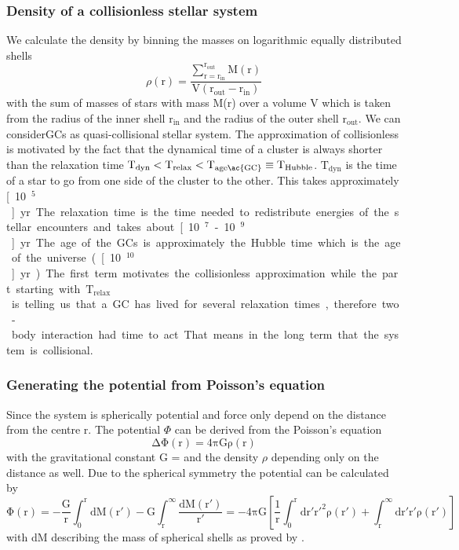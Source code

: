 \subsubsection{Density of a collisionless stellar system}
We calculate the density by binning the masses on logarithmic equally distributed shells
\begin{equation}\label{eq:density}
\rho(\mathrm{r})=\frac{\sum_{\mathrm{r=r_{in}}}^{\mathrm{r_{out}}}\mathrm{M(r)}}{\mathrm{V(r_{out}-r_{in})}}
\end{equation} 
with the sum of masses of stars with mass M(r) over a volume V which is taken from the radius of the inner shell \(\mathrm{r_{in}}\) and the radius of the outer shell \(\mathrm{r_{out}}\). We can consider\acp{GC} as quasi-collisional stellar system. The approximation of collisionless is motivated by the fact that the dynamical time of a cluster is always shorter than the relaxation time \(\mathrm{T_{dyn} < T_{relax} < T_{age\ac{GC}} \equiv T_{Hubble}}\). \(\mathrm{T_{dyn}}\) is the time of a star to go from one side of the cluster to the other. This takes approximately \unit[10\(^5\)]{yr}. The relaxation time is the time needed to redistribute energies of the stellar encounters and takes about \unit[10\(^7\) - 10\(^9\)]{yr}. The age of the \acp{GC} is approximately the Hubble time which is the age of the universe (\unit[10\(^10\)]{yr}). The first term motivates the collisionless approximation while the part starting with \(\mathrm{T_{relax}}\) is telling us that a \ac{GC} has lived for several relaxation times, therefore two-body interaction had time to act. That means in the long term that the system is collisional. 
\subsubsection{Generating the potential from Poisson's equation}
Since the system is spherically potential and force only depend on the distance from the centre r. The potential \(\Phi\) can be derived from the Poisson's equation \begin{equation}\label{eq:Poisson}
\mathrm{\Delta\Phi(r)=4\pi G \rho(r)}
\end{equation}
with the gravitational constant G =  \citep{2015arXiv150707956M} and the density \(\rho\) depending only on the distance as well. Due to the spherical symmetry the potential can be calculated by 
\begin{equation}\label{eq:numerical_poisson}
\mathrm{\Phi(r)=-\frac{G}{r}\int_0^r{\mathrm{d}M(r')}-G\int_r^{\infty}{\frac{\mathrm{d}M(r')}{r'}}=-4\pi G\left[\frac{1}{r}\int_0^r\mathrm{d}r'r'^2\rho(r')+\int_r^{\infty}\mathrm{d}r'r'\rho(r')\right]}
\end{equation} with dM describing the mass of spherical shells as proved by \citet[eq. 2.28]{2008gady.book.....B}. 
